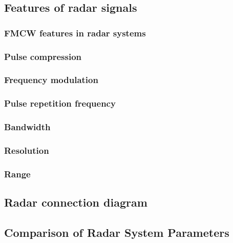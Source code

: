 \subsection{Features of radar signals}



\subsubsection{FMCW features in radar systems}
\subsubsection{Pulse compression}
\subsubsection{Frequency modulation}
\subsubsection{Pulse repetition frequency}
\subsubsection{Bandwidth}
\subsubsection{Resolution}
\subsubsection{Range}


\subsection{Radar connection diagram}


\subsection{Comparison of Radar System Parameters}

